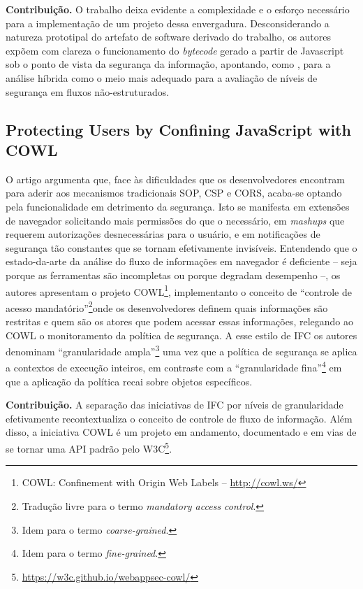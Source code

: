 \textbf{Contribuição.} O trabalho deixa evidente a complexidade e o esforço necessário para a implementação de um projeto dessa envergadura. Desconsiderando a natureza prototipal do artefato de software derivado do trabalho, os autores expõem com clareza o funcionamento do \textit{bytecode} gerado a partir de Javascript sob o ponto de vista da segurança da informação, apontando, como \cite{Hedin2014}, para a análise híbrida como o meio mais adequado para a avaliação de níveis de segurança em fluxos não-estruturados.


\subsection{Protecting Users by Confining JavaScript with COWL \cite{Stefan2014}}
O artigo argumenta que, face às dificuldades que os desenvolvedores encontram para aderir aos mecanismos tradicionais SOP, CSP e CORS, acaba-se optando pela funcionalidade em detrimento da segurança. Isto se manifesta em extensões de navegador solicitando mais permissões do que o necessário, em \textit{mashups} que requerem autorizações desnecessárias para o usuário, e em notificações de segurança tão constantes que se tornam efetivamente invisíveis. Entendendo que o estado-da-arte da análise do fluxo de informações em navegador é deficiente -- seja porque as ferramentas são incompletas ou porque degradam desempenho --, os autores apresentam o projeto COWL\footnote{COWL: Confinement with Origin Web Labels -- \url{http://cowl.ws/}}, implementanto o conceito de ``controle de acesso mandatório''\footnote{Tradução livre para o termo \textit{mandatory access control}.}onde os desenvolvedores definem quais informações são restritas e quem são os atores que podem acessar essas informações, relegando ao COWL o monitoramento da política de segurança. A esse estilo de IFC os autores denominam ``granularidade ampla''\footnote{Idem para o termo \textit{coarse-grained}.} uma vez que a política de segurança se aplica a contextos de execução inteiros, em contraste com a ``granularidade fina''\footnote{Idem para o termo \textit{fine-grained}.} em que a aplicação da política recai sobre objetos específicos.

\textbf{Contribuição.} A separação das iniciativas de IFC por níveis de granularidade efetivamente recontextualiza o conceito de controle de fluxo de informação. Além disso, a iniciativa COWL é um projeto em andamento, documentado e em vias de se tornar uma API padrão pelo W3C\footnote{\url{https://w3c.github.io/webappsec-cowl/}}.


